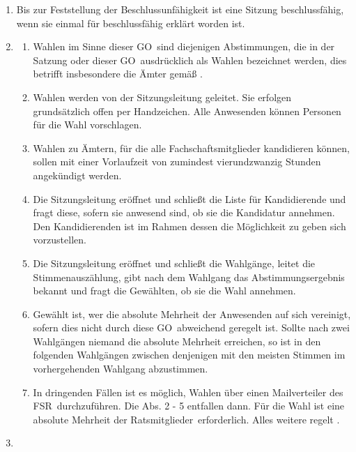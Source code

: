 \documentclass[a4paper, 12pt, ngerman]{article}
\newcommand{\rates}{FSR}
\newcommand{\go}{GO}
\newcommand{\mitglieder}{Ratsmitglieder}
\begin{document}
\begin{enumerate}[leftmargin=0cm]
    \newpage
	
	
	\item {}
	
		Bis zur Feststellung der Beschlussunfähigkeit ist eine Sitzung
		beschlussfähig, wenn sie einmal für beschlussfähig erklärt
		worden ist.
	
	\item {}\label{wahlen}
	
	\begin{enumerate}[leftmargin=0cm]
		\item Wahlen im Sinne dieser \go~sind diejenigen Abstimmungen, die in der Satzung oder dieser \go~ausdrücklich als Wahlen bezeichnet werden, dies betrifft insbesondere die Ämter gemäß .
		\item Wahlen werden von der Sitzungsleitung geleitet. Sie erfolgen grundsätzlich offen per Handzeichen. Alle Anwesenden können Personen für die Wahl vorschlagen.
		\item Wahlen zu Ämtern, für die alle Fachschaftsmitglieder kandidieren können, sollen mit einer Vorlaufzeit von zumindest vierundzwanzig Stunden angekündigt werden.
		\item Die Sitzungsleitung eröffnet und schließt die Liste für Kandidierende und fragt diese, sofern sie anwesend sind, ob sie die Kandidatur annehmen. Den Kandidierenden ist im Rahmen dessen die Möglichkeit zu geben sich vorzustellen.
		\item Die Sitzungsleitung eröffnet und schließt die Wahlgänge, leitet
		die Stimmenauszählung, gibt nach dem Wahlgang das
		Abstimmungsergebnis bekannt und fragt die Gewählten, ob sie
		die Wahl annehmen.
		\item Gewählt ist, wer die absolute Mehrheit der Anwesenden auf sich vereinigt, sofern dies nicht durch diese \go~abweichend geregelt ist. Sollte nach zwei Wahlgängen niemand die absolute Mehrheit erreichen, so ist in den folgenden Wahlgängen zwischen denjenigen mit den meisten Stimmen im vorhergehenden Wahlgang abzustimmen.
		\item In dringenden Fällen ist es möglich, Wahlen über einen Mailverteiler des \rates~durchzuführen. Die Abs. 2 - 5 entfallen dann. Für die Wahl ist eine absolute Mehrheit der \mitglieder~erforderlich. Alles weitere regelt .
	\end{enumerate}

	\item {}\label{abstimmung}
	

\end{enumerate}
\end{document}
